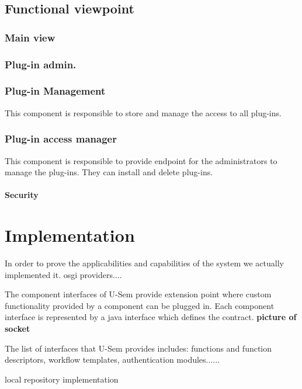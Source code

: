\subsection{Functional viewpoint}

\subsubsection{Main view}

\subsubsection{Plug-in admin.}

\subsubsection{Plug-in Management}

This component is responsible to store and manage the access to all plug-ins.

\subsubsection{Plug-in access manager}

This component is responsible to provide endpoint for the administrators to manage the plug-ins. They can install and delete plug-ins.

\paragraph{Security}

\section{Implementation}

In order to prove the applicabilities and capabilities of the system we actually implemented it.
osgi providers....

The component interfaces of U-Sem provide extension point where custom functionality provided by a component can be plugged in. Each component interface is represented by a java interface which defines the contract. \textbf{picture of socket}

The list of interfaces that U-Sem provides includes: functions and function descriptors, workflow templates, authentication modules......

local repository implementation

